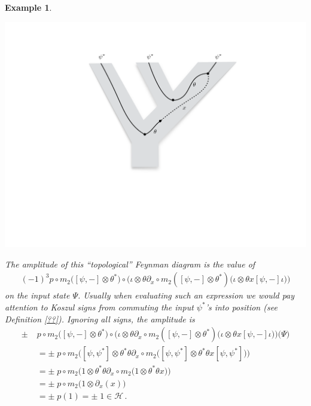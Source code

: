 \documentclass[english,letter paper,12pt,leqno]{article}
\theoremstyle{example}
\newtheorem{example}[theorem]{Example}
\numberwithin{equation}{section}
\begin{document}
\begin{example}
\begin{center}
\includegraphics[scale=0.3]{dia6}
\end{center}
The amplitude of this ``topological'' Feynman diagram is the value of
\begin{align*}
(-1)^3 p \circ m_2 \big([\psi, -] \otimes \theta^*\big) \circ \big( \iota \otimes \theta \partial_x \circ m_2 ([\psi, -] \otimes \theta^*)\big( \iota \otimes \theta x [\psi, -] \iota \big)\big)
\end{align*}
on the input state $\Psi$. Usually when evaluating such an expression we would pay attention to Koszul signs from commuting the input $\psi^*$'s into position (see Definition \ref{??}). Ignoring all signs, the amplitude is
\begin{align*}
\pm \; & p \circ m_2 \big([\psi, -] \otimes \theta^*\big) \circ \big( \iota \otimes \theta \partial_x \circ m_2 ([\psi, -] \otimes \theta^*)\big( \iota \otimes \theta x [\psi, -] \iota \big)\big)\Big( \Psi \Big)\\
&= \pm \; p \circ m_2 \big([\psi, \psi^*] \otimes \theta^* \theta \partial_x \circ m_2 ([\psi, \psi^*] \otimes \theta^* \theta x [\psi, \psi^*] \big)\big)\\
&= \pm \; p \circ m_2 \big(1 \otimes \theta^* \theta \partial_x \circ m_2 (1 \otimes \theta^* \theta x \big)\big)\\
&= \pm \; p \circ m_2 \big(1 \otimes \partial_x(x) \big)\\
&= \pm \; p(1) = \pm \; 1 \in \mathscr{H}\,.
\end{align*}
\end{example}
\end{document}
